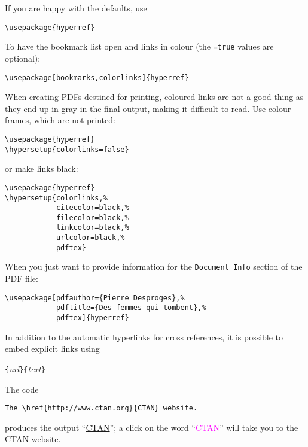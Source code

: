 If you are happy with the defaults, use
\begin{code}
\begin{verbatim}
\usepackage{hyperref}
\end{verbatim}
\end{code}

To have the bookmark list open and links in colour
(the \texttt{=true} values are optional):
\begin{code}
\begin{verbatim}
\usepackage[bookmarks,colorlinks]{hyperref}
\end{verbatim}
\end{code}

When creating PDFs destined for printing, coloured links are not a
good thing as they end up in gray in the final output, making it
difficult to read. Use colour frames, which are not printed:
\begin{code}
\begin{verbatim}
\usepackage{hyperref}
\hypersetup{colorlinks=false}
\end{verbatim}
\end{code}
\noindent or make links black:
\begin{code}
\begin{verbatim}
\usepackage{hyperref}
\hypersetup{colorlinks,%
            citecolor=black,%
            filecolor=black,%
            linkcolor=black,%
            urlcolor=black,%
            pdftex}
\end{verbatim}
\end{code}

When you just want to provide information for the
\texttt{Document Info} section of the PDF file:
\begin{code}
\begin{verbatim}
\usepackage[pdfauthor={Pierre Desproges},%
            pdftitle={Des femmes qui tombent},%
            pdftex]{hyperref}
\end{verbatim}
\end{code}

\vspace{\baselineskip}

In addition to the automatic hyperlinks for cross references, it is
possible to embed explicit links using
\begin{lscommand}
  \verb|{|\emph{url}\verb|}{|\emph{text}\verb|}|
\end{lscommand}

The code
\begin{code}
\begin{verbatim}
The \href{http://www.ctan.org}{CTAN} website.
\end{verbatim}
\end{code}
produces the output ``\href{http://www.ctan.org}{CTAN}'';
a click on the word ``\textcolor{magenta}{CTAN}''
will take you to the CTAN website.

